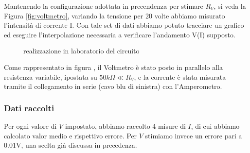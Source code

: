\documentclass[a4paper]{article}
\theoremstyle{definition}
\begin{document}
Mantenendo la configurazione adottata in precendenza per stimare $R_{V}$, si veda la Figura \ref{fig:voltmetro}, variando la tensione per 20 volte abbiamo misurato l'intensità di corrente I. Con tale set di dati abbiamo potuto tracciare un grafico ed eseguire l'interpolazione necessaria a verificare l'andamento V(I) supposto.

\begin{figure}[!ht]

    \caption{realizzazione in laboratorio del circuito}
  \label{fig:fotoLeggeOhm}
\end{figure}
\noindent Come rappresentato in figura , il Voltmetro è stato posto in parallelo alla resistenza variabile, ipostata su 50\(k\Omega \ll R_{V}\), e la corrente è stata misurata tramite il collegamento in serie (cavo blu di sinistra) con l'Amperometro.


\subsubsection*{Dati raccolti}

Per ogni valore di $V$ impostato, abbiamo raccolto 4 misure di $I$, di cui abbiamo calcolato valor medio e rispettivo errore. Per $V$ stimiamo invece un errore pari a 0.01V, una scelta già discussa in precedenza.
\end{document}
